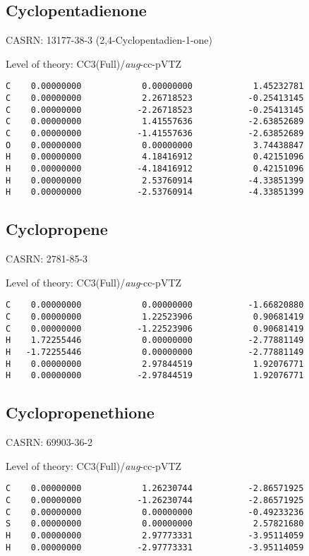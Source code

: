 \documentclass[journal=jctcce,manuscript=article,layout=traditional]{achemso}
\newcommand{\AVTZ}{\emph{aug}-cc-pVTZ}
\begin{document}
\subsection{Cyclopentadienone}

CASRN: 13177-38-3 (2,4-Cyclopentadien-1-one)

\begin{singlespace}
\noindent Level of theory: CC3(Full)/{\AVTZ}
\begin{verbatim}
C    0.00000000            0.00000000            1.45232781
C    0.00000000            2.26718523           -0.25413145
C    0.00000000           -2.26718523           -0.25413145
C    0.00000000            1.41557636           -2.63852689
C    0.00000000           -1.41557636           -2.63852689
O    0.00000000            0.00000000            3.74438847
H    0.00000000            4.18416912            0.42151096
H    0.00000000           -4.18416912            0.42151096
H    0.00000000            2.53760914           -4.33851399
H    0.00000000           -2.53760914           -4.33851399
\end{verbatim}
\end{singlespace}

\subsection{Cyclopropene}

CASRN: 2781-85-3

\begin{singlespace}
\noindent Level of theory: CC3(Full)/{\AVTZ}
\begin{verbatim}
C    0.00000000            0.00000000           -1.66820880
C    0.00000000            1.22523906            0.90681419
C    0.00000000           -1.22523906            0.90681419
H    1.72255446            0.00000000           -2.77881149
H   -1.72255446            0.00000000           -2.77881149
H    0.00000000            2.97844519            1.92076771
H    0.00000000           -2.97844519            1.92076771
\end{verbatim}
\end{singlespace}

\subsection{Cyclopropenethione}

CASRN: 69903-36-2

\begin{singlespace}
\noindent Level of theory: CC3(Full)/{\AVTZ}
\begin{verbatim}
C    0.00000000            1.26230744           -2.86571925
C    0.00000000           -1.26230744           -2.86571925
C    0.00000000            0.00000000           -0.49233236
S    0.00000000            0.00000000            2.57821680
H    0.00000000            2.97773331           -3.95114059
H    0.00000000           -2.97773331           -3.95114059
\end{verbatim}
\end{singlespace}
\end{document}

